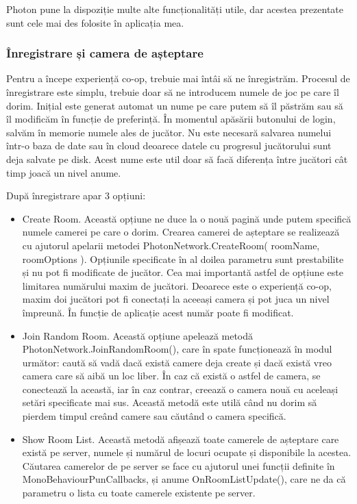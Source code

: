 \documentclass[12pt, a4paper]{article}
\begin{document}
	Photon pune la dispoziție multe alte funcționalități utile, dar acestea prezentate sunt cele mai des folosite în aplicația mea.
	
	
	
	
	
	\subsubsection{Înregistrare și camera de așteptare}
	
	Pentru a începe experiență co-op, trebuie mai întâi să ne înregistrăm. Procesul de înregistrare este simplu, trebuie doar să ne introducem numele de joc pe care îl dorim. Inițial este generat automat un nume pe care putem să îl păstrăm sau să îl modificăm în funcție de preferință. În momentul apăsării butonului de login, salvăm în memorie numele ales de jucător. Nu este necesară salvarea numelui într-o baza de date sau în cloud deoarece datele cu progresul jucătorului sunt deja salvate pe disk. Acest nume este util doar să facă diferența între jucători cât timp joacă un nivel anume.
	\newline
	
	După înregistrare apar 3 opțiuni:
	
	\begin{itemize}
		\item Create Room. Această opțiune ne duce la o nouă pagină unde putem specifică numele camerei pe care o dorim. Crearea camerei de așteptare se realizează cu ajutorul apelarii metodei PhotonNetwork.CreateRoom( roomName, roomOptions ). Opțiunile specificate în al doilea parametru sunt prestabilite și nu pot fi modificate de jucător. Cea mai importantă astfel de opțiune este limitarea numărului maxim de jucători. Deoarece este o experiență co-op, maxim doi jucători pot fi conectați la aceeași camera și pot juca un nivel împreună. În funcție de aplicație acest număr poate fi modificat.
		\item Join Random Room. Această opțiune apelează metodă PhotonNetwork.JoinRandomRoom(), care în spate funcționează în modul următor: caută să vadă dacă există camere deja create și dacă există vreo camera care să aibă un loc liber. În caz că există o astfel de camera, se conectează la această, iar în caz contrar, creează o camera nouă cu aceleași setări specificate mai sus. Această metodă este utilă când nu dorim să pierdem timpul creând camere sau căutând o camera specifică.
		\item Show Room List. Această metodă afișează toate camerele de așteptare care există pe server, numele și numărul de locuri ocupate și disponibile la acestea. Căutarea camerelor de pe server se face cu ajutorul unei funcții definite în MonoBehaviourPunCallbacks, și anume OnRoomListUpdate(), care ne da că parametru o lista cu toate camerele existente pe server.
	\end{itemize}
	
\end{document}
